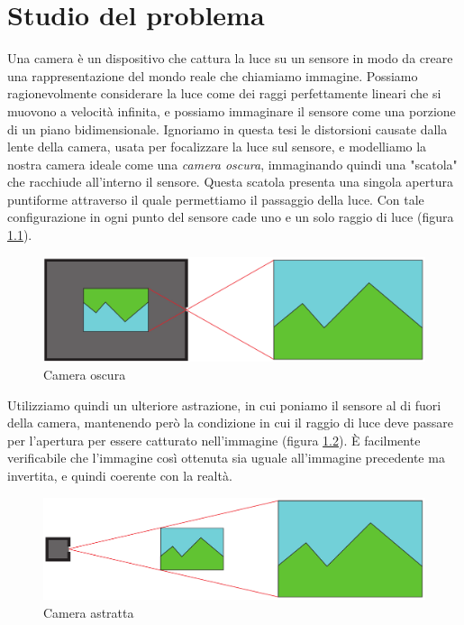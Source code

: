 \chapter{Studio del problema}
\label{sec:teoria}

Una camera è un dispositivo che cattura la luce su un sensore in modo da creare una rappresentazione del mondo reale che chiamiamo immagine.
Possiamo ragionevolmente considerare la luce come dei raggi perfettamente lineari che si muovono a velocità infinita, e possiamo immaginare il sensore come una porzione di un piano bidimensionale.
Ignoriamo in questa tesi le distorsioni causate dalla lente della camera, usata per focalizzare la luce sul sensore, e modelliamo la nostra camera ideale come una \emph{camera oscura}, immaginando quindi una "scatola" che racchiude all'interno il sensore.
Questa scatola presenta una singola apertura puntiforme attraverso il quale permettiamo il passaggio della luce.
Con tale configurazione in ogni punto del sensore cade uno e un solo raggio di luce (figura \ref{fig:camera oscura}).
\begin{figure}
    \caption{Camera oscura}
    \label{fig:camera oscura}
    \centering
    \includegraphics[width=.8\textwidth]{images/camera oscura.pdf} 
\end{figure}


Utilizziamo quindi un ulteriore astrazione, in cui poniamo il sensore al di fuori della camera, mantenendo però la condizione in cui il raggio di luce deve passare per l'apertura per essere catturato nell'immagine (figura \ref{fig:camera model}).
È facilmente verificabile che l'immagine così ottenuta sia uguale all'immagine precedente ma invertita, e quindi coerente con la realtà.
\begin{figure}
    \caption{Camera astratta}
    \label{fig:camera model}
    \centering
    \includegraphics[width=.8\textwidth]{images/camera astratta.pdf} 
\end{figure}

